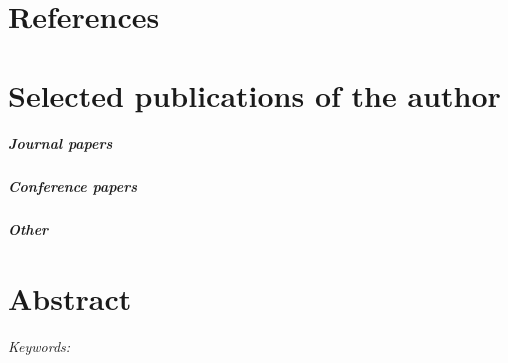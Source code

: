 \renewcommand{\bibname}{References}
\chaptermark{\bibname}
\chapter{\bibname}
{\footnotesize\printbibliography[heading=none]}


\chapter{Selected publications of the author}\label{chapPublications}

\paragraph{Journal papers}
\begin{refsection}
	\nocite{SongHuangShuStranskyWuSubmitted}
	\newrefcontext[sorting=ynt]
	\printbibliography[heading=none]
\end{refsection}

\paragraph{Conference papers}
\begin{refsection}
	\nocite{StranskyNMM2010}
	\nocite{StranskyNMM2011}
	\nocite{StranskyNMM2012}
	\nocite{StranskyNMM2014}
	\nocite{StranskyNMM2015}
	\nocite{StranskyEngMech2012}
	\nocite{StranskyEngMech2014}
	\nocite{StranskyEngMech2015}
	\nocite{StranskyParticles2011}
	\nocite{StranskyParticles2013}
	\nocite{StranskyModelingAndSimulation2010}
	\newrefcontext[sorting=ynt]
	\printbibliography[heading=none]
\end{refsection}

\paragraph{Other}
\begin{refsection}
	\nocite{yade2015}
	\newrefcontext[sorting=ynt]
	\printbibliography[heading=none]
\end{refsection}


\chapter{Abstract}
\abstract
\vspace{2em}
\noindent \emph{Keywords:} \keywords

